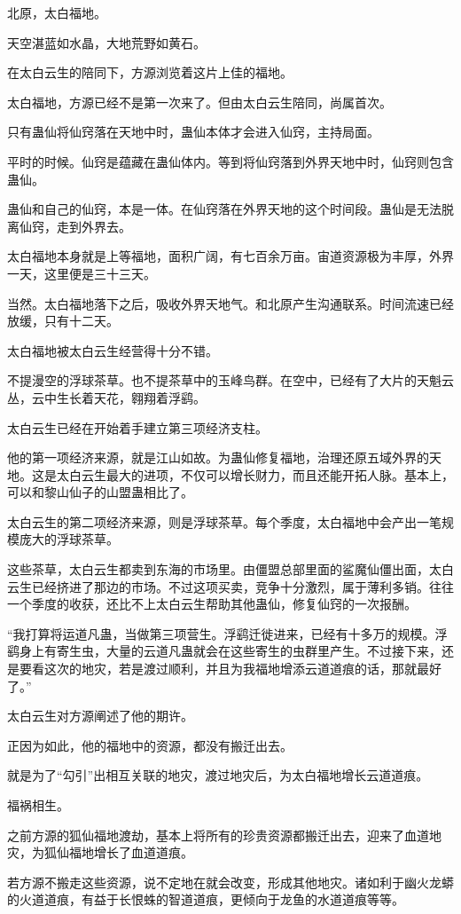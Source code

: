 \begin{this_body}
北原，太白福地。

天空湛蓝如水晶，大地荒野如黄石。

在太白云生的陪同下，方源浏览着这片上佳的福地。

太白福地，方源已经不是第一次来了。但由太白云生陪同，尚属首次。

只有蛊仙将仙窍落在天地中时，蛊仙本体才会进入仙窍，主持局面。

平时的时候。仙窍是蕴藏在蛊仙体内。等到将仙窍落到外界天地中时，仙窍则包含蛊仙。

蛊仙和自己的仙窍，本是一体。在仙窍落在外界天地的这个时间段。蛊仙是无法脱离仙窍，走到外界去。

太白福地本身就是上等福地，面积广阔，有七百余万亩。宙道资源极为丰厚，外界一天，这里便是三十三天。

当然。太白福地落下之后，吸收外界天地气。和北原产生沟通联系。时间流速已经放缓，只有十二天。

太白福地被太白云生经营得十分不错。

不提漫空的浮球茶草。也不提茶草中的玉峰鸟群。在空中，已经有了大片的天魁云丛，云中生长着天花，翱翔着浮鹞。

太白云生已经在开始着手建立第三项经济支柱。

他的第一项经济来源，就是江山如故。为蛊仙修复福地，治理还原五域外界的天地。这是太白云生最大的进项，不仅可以增长财力，而且还能开拓人脉。基本上，可以和黎山仙子的山盟蛊相比了。

太白云生的第二项经济来源，则是浮球茶草。每个季度，太白福地中会产出一笔规模庞大的浮球茶草。

这些茶草，太白云生都卖到东海的市场里。由僵盟总部里面的鲨魔仙僵出面，太白云生已经挤进了那边的市场。不过这项买卖，竞争十分激烈，属于薄利多销。往往一个季度的收获，还比不上太白云生帮助其他蛊仙，修复仙窍的一次报酬。

“我打算将运道凡蛊，当做第三项营生。浮鹞迁徙进来，已经有十多万的规模。浮鹞身上有寄生虫，大量的云道凡蛊就会在这些寄生的虫群里产生。不过接下来，还是要看这次的地灾，若是渡过顺利，并且为我福地增添云道道痕的话，那就最好了。”

太白云生对方源阐述了他的期许。

正因为如此，他的福地中的资源，都没有搬迁出去。

就是为了“勾引”出相互关联的地灾，渡过地灾后，为太白福地增长云道道痕。

福祸相生。

之前方源的狐仙福地渡劫，基本上将所有的珍贵资源都搬迁出去，迎来了血道地灾，为狐仙福地增长了血道道痕。

若方源不搬走这些资源，说不定地在就会改变，形成其他地灾。诸如利于幽火龙蟒的火道道痕，有益于长恨蛛的智道道痕，更倾向于龙鱼的水道道痕等等。


\end{this_body}
